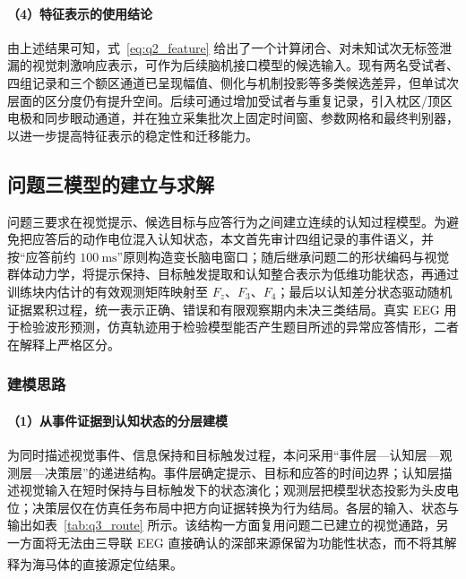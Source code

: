 \documentclass[a4paper]{ctexart}
\numberwithin{figure}{section}       %
\newcommand{\upcite}[1]{\textsuperscript{\cite{#1}}} %
\begin{document}
\paragraph{（4）特征表示的使用结论}

由上述结果可知，式~\eqref{eq:q2_feature} 给出了一个计算闭合、对未知试次无标签泄漏的视觉刺激响应表示，可作为后续脑机接口模型的候选输入。现有两名受试者、四组记录和三个额区通道已呈现幅值、侧化与机制投影等多类候选差异，但单试次层面的区分度仍有提升空间。后续可通过增加受试者与重复记录，引入枕区/顶区电极和同步眼动通道，并在独立采集批次上固定时间窗、参数网格和最终判别器，以进一步提高特征表示的稳定性和迁移能力。
\subsection{问题三模型的建立与求解}

问题三要求在视觉提示、候选目标与应答行为之间建立连续的认知过程模型。为避免把应答后的动作电位混入认知状态，本文首先审计四组记录的事件语义，并按“应答前约 $100~\mathrm{ms}$”原则构造变长脑电窗口；随后继承问题二的形状编码与视觉群体动力学，将提示保持、目标触发提取和认知整合表示为低维功能状态，再通过训练块内估计的有效观测矩阵映射至 $F_z$、$F_3$、$F_4$；最后以认知差分状态驱动随机证据累积过程，统一表示正确、错误和有限观察期内未决三类结局。真实 EEG 用于检验波形预测，仿真轨迹用于检验模型能否产生题目所述的异常应答情形，二者在解释上严格区分。

\subsubsection{建模思路}

\paragraph{（1）从事件证据到认知状态的分层建模}

为同时描述视觉事件、信息保持和目标触发过程，本问采用“事件层---认知层---观测层---决策层”的递进结构。事件层确定提示、目标和应答的时间边界；认知层描述视觉输入在短时保持与目标触发下的状态演化；观测层把模型状态投影为头皮电位；决策层仅在仿真任务布局中把方向证据转换为行为结局。各层的输入、状态与输出如表~\ref{tab:q3_route} 所示。该结构一方面复用问题二已建立的视觉通路，另一方面将无法由三导联 EEG 直接确认的深部来源保留为功能性状态，而不将其解释为海马体的直接源定位结果\upcite{glomb2022computational,daume2024control}。
\end{document}
